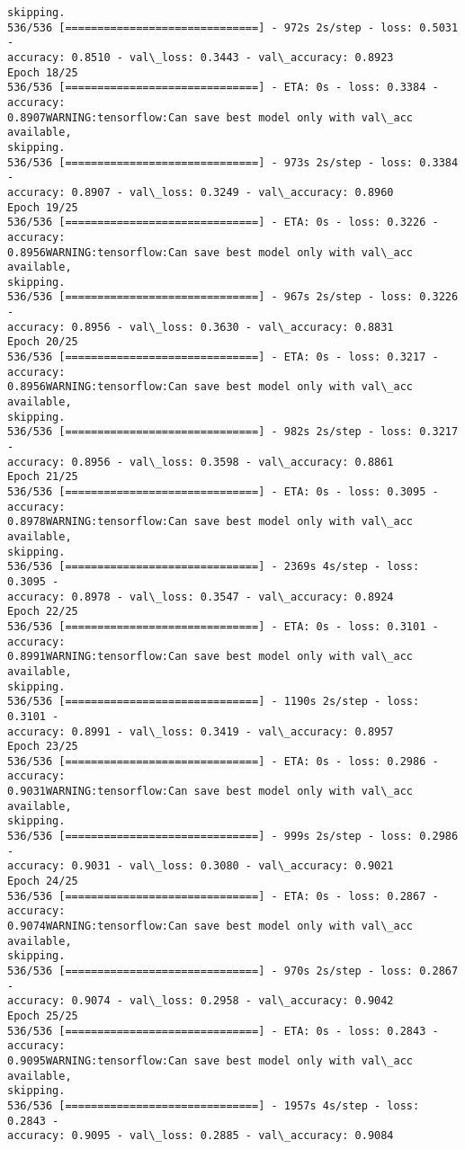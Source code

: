 \documentclass[11pt]{article}
\begin{document}
\begin{Verbatim}[commandchars=\\\{\}]
skipping.
536/536 [==============================] - 972s 2s/step - loss: 0.5031 -
accuracy: 0.8510 - val\_loss: 0.3443 - val\_accuracy: 0.8923
Epoch 18/25
536/536 [==============================] - ETA: 0s - loss: 0.3384 - accuracy:
0.8907WARNING:tensorflow:Can save best model only with val\_acc available,
skipping.
536/536 [==============================] - 973s 2s/step - loss: 0.3384 -
accuracy: 0.8907 - val\_loss: 0.3249 - val\_accuracy: 0.8960
Epoch 19/25
536/536 [==============================] - ETA: 0s - loss: 0.3226 - accuracy:
0.8956WARNING:tensorflow:Can save best model only with val\_acc available,
skipping.
536/536 [==============================] - 967s 2s/step - loss: 0.3226 -
accuracy: 0.8956 - val\_loss: 0.3630 - val\_accuracy: 0.8831
Epoch 20/25
536/536 [==============================] - ETA: 0s - loss: 0.3217 - accuracy:
0.8956WARNING:tensorflow:Can save best model only with val\_acc available,
skipping.
536/536 [==============================] - 982s 2s/step - loss: 0.3217 -
accuracy: 0.8956 - val\_loss: 0.3598 - val\_accuracy: 0.8861
Epoch 21/25
536/536 [==============================] - ETA: 0s - loss: 0.3095 - accuracy:
0.8978WARNING:tensorflow:Can save best model only with val\_acc available,
skipping.
536/536 [==============================] - 2369s 4s/step - loss: 0.3095 -
accuracy: 0.8978 - val\_loss: 0.3547 - val\_accuracy: 0.8924
Epoch 22/25
536/536 [==============================] - ETA: 0s - loss: 0.3101 - accuracy:
0.8991WARNING:tensorflow:Can save best model only with val\_acc available,
skipping.
536/536 [==============================] - 1190s 2s/step - loss: 0.3101 -
accuracy: 0.8991 - val\_loss: 0.3419 - val\_accuracy: 0.8957
Epoch 23/25
536/536 [==============================] - ETA: 0s - loss: 0.2986 - accuracy:
0.9031WARNING:tensorflow:Can save best model only with val\_acc available,
skipping.
536/536 [==============================] - 999s 2s/step - loss: 0.2986 -
accuracy: 0.9031 - val\_loss: 0.3080 - val\_accuracy: 0.9021
Epoch 24/25
536/536 [==============================] - ETA: 0s - loss: 0.2867 - accuracy:
0.9074WARNING:tensorflow:Can save best model only with val\_acc available,
skipping.
536/536 [==============================] - 970s 2s/step - loss: 0.2867 -
accuracy: 0.9074 - val\_loss: 0.2958 - val\_accuracy: 0.9042
Epoch 25/25
536/536 [==============================] - ETA: 0s - loss: 0.2843 - accuracy:
0.9095WARNING:tensorflow:Can save best model only with val\_acc available,
skipping.
536/536 [==============================] - 1957s 4s/step - loss: 0.2843 -
accuracy: 0.9095 - val\_loss: 0.2885 - val\_accuracy: 0.9084
    \end{Verbatim}
\end{document}
